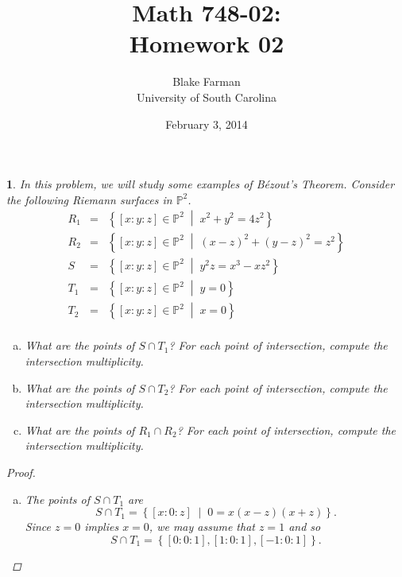 \documentclass[10pt]{amsart}
\author{Blake Farman\\University of South Carolina}
\title{Math 748-02:\\Homework 02}
\date{February 3, 2014}
\begin{document}
\maketitle

\providecommand{\p}{\mathfrak{p}}
\providecommand{\m}{\mathfrak{m}}
\providecommand{\Deck}[1]{\operatorname{Deck}\left(#1\right)}

\newtheorem{thm}{}
\newtheorem{lem}{Lemma}
\newtheorem{prop}{Proposition}
\theoremstyle{definition}
\newtheorem{defn}{Definition}[thm]

\newcommand{\A}{\mathbb{A}}

\begin{thm}
  In this problem, we will study some examples of B\'{e}zout's Theorem.
  Consider the following Riemann surfaces in $\mathbb{P}^2$.
  \begin{eqnarray*}
    R_1 &=& \left\{ [x : y : z] \in \mathbb{P}^2 \;\middle\vert\; x^2 + y^2 = 4z^2 \right\}\\
    R_2 &=& \left\{ [x : y : z] \in \mathbb{P}^2 \;\middle\vert\; (x - z)^2 + (y - z)^2 = z^2 \right\}\\
    S &=& \left\{ [x : y : z] \in \mathbb{P}^2 \;\middle\vert\; y^2z = x^3 - xz^2\right\}\\
    T_1 &=& \left\{ [x : y : z] \in \mathbb{P}^2 \;\middle\vert\; y = 0 \right\}\\
    T_2 &=& \left\{ [x : y : z] \in \mathbb{P}^2 \;\middle\vert\; x = 0 \right\}\\
  \end{eqnarray*}
  \begin{enumerate}[(a)]
  \item
    What are the points of $S \cap T_1$?
    For each point of intersection, compute the intersection multiplicity.
  \item
    What are the points of $S \cap T_2$?
    For each point of intersection, compute the intersection multiplicity.
  \item
    What are the points of $R_1 \cap R_2$?
    For each point of intersection, compute the intersection multiplicity.
  \end{enumerate}

  \begin{proof}
    \begin{enumerate}[(a)]
    \item
      The points of $S \cap T_1$ are
      $$S \cap T_1 = \left\{ [x : 0 : z] \;\middle\vert\; 0 = x(x - z)(x + z)\right\}.$$
      Since $z = 0$ implies $x = 0$, we may assume that $z = 1$ and so
      $$S \cap T_1 = \left\{ [0 : 0 : 1], [1 : 0 : 1], [-1 : 0 : 1] \right\}.$$
      

\end{enumerate}
\end{proof}
\end{thm}
\end{document}
